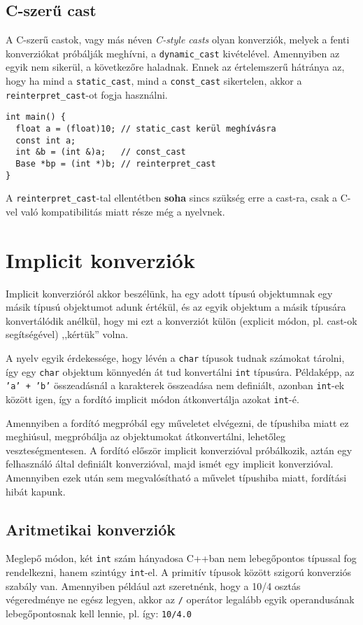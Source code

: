 \documentclass[../cpp_book/cpp_book.tex]{subfiles}
\begin{document}
	\subsection{C-szerű cast}
	A C-szerű castok, vagy más néven \textit{C-style casts} olyan konverziók, melyek a fenti konverziókat próbálják meghívni, a \texttt{dynamic\_cast} kivételével. Amennyiben az egyik nem sikerül, a következőre haladnak. Ennek az értelemszerű hátránya az, hogy ha mind a \texttt{static\_cast}, mind a \texttt{const\_cast} sikertelen, akkor a \texttt{reinterpret\_cast}-ot fogja használni.
	\begin{lstlisting}
int main() {
  float a = (float)10; // static_cast kerül meghívásra
  const int a;
  int &b = (int &)a;   // const_cast
  Base *bp = (int *)b; // reinterpret_cast
}
	\end{lstlisting}
	A \texttt{reinterpret\_cast}-tal ellentétben \textbf{soha} sincs szükség erre a cast-ra, csak a C-vel való kompatibilitás miatt része még a nyelvnek.
	\section{Implicit konverziók}
	Implicit konverzióról akkor beszélünk, ha egy adott típusú objektumnak egy másik típusú objektumot adunk értékül, és az egyik objektum a másik típusára konvertálódik anélkül, hogy mi ezt a konverziót külön (explicit módon, pl. cast-ok segítségével) ,,kértük'' volna.
	
	A nyelv egyik érdekessége, hogy lévén a \texttt{char} típusok tudnak számokat tárolni, így egy \texttt{char} objektum könnyedén át tud konvertálni \texttt{int} típusúra. Példaképp, az \texttt{'a' + 'b'} összeadásnál a karakterek összeadása nem definiált, azonban \texttt{int}-ek között igen, így a fordító implicit módon átkonvertálja azokat \texttt{int}-é.
	
	Amennyiben a fordító megpróbál egy műveletet elvégezni, de típushiba miatt ez meghiúsul, megpróbálja az objektumokat átkonvertálni, lehetőleg veszteségmentesen. A fordító először implicit konverzióval próbálkozik, aztán egy felhasználó által definiált konverzióval, majd ismét egy implicit konverzióval. Amennyiben ezek után sem megvalósítható a művelet típushiba miatt, fordítási hibát kapunk.
	\subsection{Aritmetikai konverziók}
	Meglepő módon, két \texttt{int} szám hányadosa C++ban nem lebegőpontos típussal fog rendelkezni, hanem szintúgy \texttt{int}-el. A primitív típusok között szigorú konverziós szabály van. Amennyiben például azt szeretnénk, hogy a 10/4 osztás végeredménye ne egész legyen, akkor az \texttt{/} operátor legalább egyik operandusának lebegőpontosnak kell lennie, pl. így: \texttt{10/4.0}
	
\end{document}
